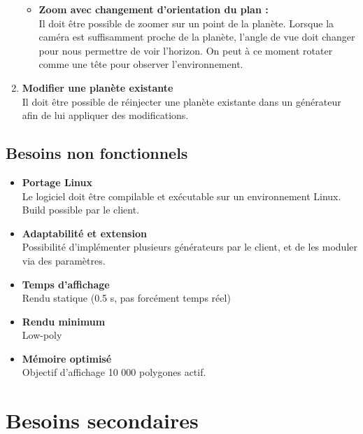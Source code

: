 \documentclass[a4paper]{article}
\begin{document}
\begin{enumerate}
\begin{itemize}
        \item \textbf{Zoom avec changement d'orientation du plan :} \\
        Il doit être possible de zoomer sur un point de la planète. Lorsque la caméra est suffisamment proche de la planète, l'angle de vue doit changer pour nous permettre de voir l'horizon. On peut à ce moment rotater comme une tête pour observer l'environnement.
        
    \end{itemize}
   
    \item \textbf{Modifier une planète existante} \\
     Il doit être possible de réinjecter une planète existante dans un générateur afin de lui appliquer des modifications.

\end{enumerate}

\subsection{Besoins non fonctionnels}

    \begin{itemize}
    
    \item \textbf{Portage Linux} \\
    Le logiciel doit être compilable et exécutable sur un environnement Linux. Build possible par le client.
    
    \item \textbf{Adaptabilité et extension} \\
    Possibilité d'implémenter plusieurs générateurs par le client, et de les moduler via des paramètres. 
    
    \item \textbf{Temps d'affichage} \\
    Rendu statique (0.5 s, pas forcément temps réel) 

    \item \textbf{Rendu minimum} \\
    Low-poly

    \item \textbf{Mémoire optimisé} \\
    Objectif d'affichage 10 000 polygones actif.
    
    \end{itemize}

\newpage
\section{Besoins secondaires}
\end{document}
